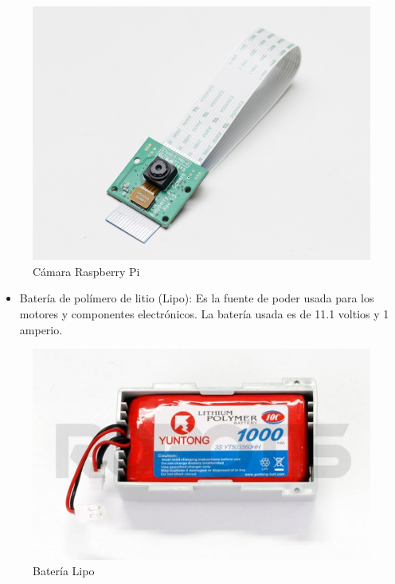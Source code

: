 \begin{figure}[hbtp]
\centering
\includegraphics[scale=0.3]{imagenes/1367-01.jpg}


\caption{C\'amara Raspberry Pi}
\label{fig:came}
\end{figure}


\begin{itemize}
\item Batería de polímero de litio (Lipo): Es la fuente de poder usada para los motores y componentes electr\'onicos. La batería usada es de 11.1 voltios y 1 amperio. \cite{bateria}
\end{itemize}


\begin{figure}[hbtp]
\centering
\includegraphics[scale=0.3]{imagenes/R-LIPOBAT.jpg}
\caption{Batería Lipo}
\label{bateria}
\end{figure}

